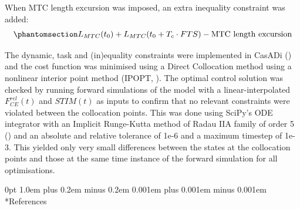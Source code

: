 \documentclass[
  11pt,
  a4paper]{article}
\makeatletter
\renewcommand{\section}{%
  \@startsection{section}{1}
    {0pt} 					%
    {1.0em plus 0.2em minus 0.2em} 	%
    {0.001em plus 0.001em minus 0.001em}    	%
    {\Large\bfseries\sffamily}%
}
\makeatother
\begin{document}
When MTC length excursion was imposed, an extra inequality constraint
was added:\\
\begin{equation}\protect\phantomsection\label{eq-lcecon}{
  L_{MTC}(t_0) + L_{MTC}(t_0 + T_c \cdot FTS) - \textrm{MTC length excursion}
}\end{equation}

The dynamic, task and (in)equality constraints were implemented in
CasADi ()
and the cost function was minimised using a Direct Collocation method
using a nonlinear interior point method (IPOPT,
).
The optimal control solution was checked by running forward simulations
of the model with a linear-interpolated \(F_{CE}^{rel}(t)\) and
\(STIM(t)\) as inputs to confirm that no relevant constraints were
violated between the collocation points. This was done using SciPy's ODE
integrator with an Implicit Runge-Kutta method of Radau IIA family of
order 5 () and an absolute and relative tolerance of 1e-6 and a maximum
timestep of 1e-3. This yielded only very small differences between the
states at the collocation points and those at the same time instance of
the forward simulation for all optimisations.

\section*{References}\label{references}
\end{document}
